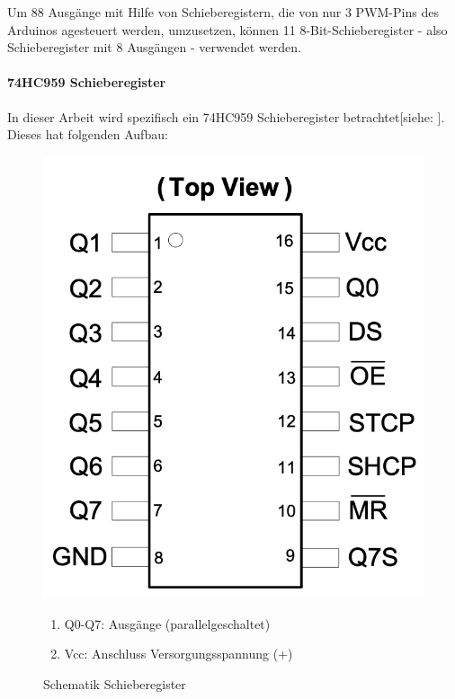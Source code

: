 Um 88 Ausgänge mit Hilfe von Schieberegistern, die von nur 3 \ac{PWM}-Pins des Arduinos agesteuert werden, umzusetzen,
können 11 8-Bit-Schieberegister  - also Schieberegister mit 8 Ausgängen - verwendet werden.

\paragraph{74HC959 Schieberegister}
In dieser Arbeit wird spezifisch ein 74HC959 Schieberegister betrachtet[siehe: \cite*[siehe ][]{DatasheetSchieberegister74HC595}].
Dieses hat folgenden Aufbau:
\begin{figure}[htbp]
\begin{minipage}{0.4\textwidth}
		\includegraphics [width=1\textwidth] {img/Schieberegister}
		\caption{Schematik Schieberegister}
		\label{img:Shift}
\end{minipage}
\begin{minipage}{0.6\textwidth}
	\begin{enumerate}
		\item Q0-Q7: Ausgänge (parallelgeschaltet)
		\item Vcc: Anschluss Versorgungsspannung (+)

\end{enumerate}
\end{minipage}
\end{figure}
